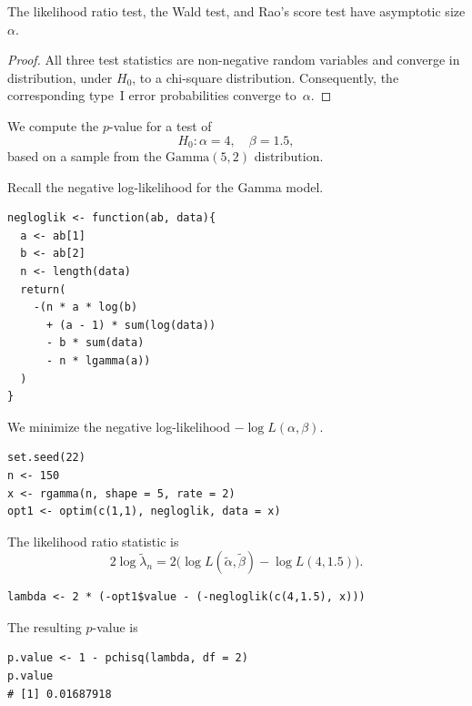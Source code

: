 \begin{corollary}
The likelihood ratio test, the Wald test, and Rao's score test have asymptotic size $\alpha$.
\end{corollary}

\begin{proof}
All three test statistics are non-negative random variables and converge in distribution, under $H_0$, to a chi-square distribution. Consequently, the corresponding type~I error probabilities converge to~$\alpha$.
\end{proof}

\bigskip

\begin{ex}
We compute the $p$-value for a test of
\[
H_0 : \alpha = 4, \quad \beta = 1.5,
\]
based on a sample from the $\mathrm{Gamma}(5,2)$ distribution.

Recall the negative log-likelihood for the Gamma model.
\begin{verbatim}
negloglik <- function(ab, data){
  a <- ab[1]
  b <- ab[2]
  n <- length(data)
  return(
    -(n * a * log(b)
      + (a - 1) * sum(log(data))
      - b * sum(data)
      - n * lgamma(a))
  )
}
\end{verbatim}

We minimize the negative log-likelihood $-\log L(\alpha,\beta)$.
\begin{verbatim}
set.seed(22)
n <- 150
x <- rgamma(n, shape = 5, rate = 2)
opt1 <- optim(c(1,1), negloglik, data = x)
\end{verbatim}

The likelihood ratio statistic is
\begin{equation}
2 \log \tilde{\lambda}_n
= 2\bigl(\log L(\tilde{\alpha},\tilde{\beta})
- \log L(4,1.5)\bigr).
\end{equation}

\begin{verbatim}
lambda <- 2 * (-opt1$value - (-negloglik(c(4,1.5), x)))
\end{verbatim}

The resulting $p$-value is
\begin{verbatim}
p.value <- 1 - pchisq(lambda, df = 2)
p.value
# [1] 0.01687918
\end{verbatim}
\end{ex}

